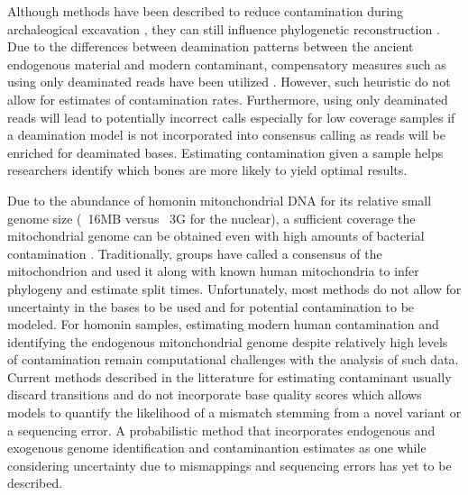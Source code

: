 \documentclass[a4paper,12pt]{article}
\begin{document}
Although methods have been described to reduce contamination during archaleogical excavation \cite{yang2005contamination}, they can still influence phylogenetic reconstruction \cite{wall2007inconsistencies}. Due to the differences between deamination patterns between the ancient endogenous material and modern contaminant, compensatory measures such as using only deaminated reads have been utilized \cite{skoglund2014separating}. However, such heuristic do not allow for estimates of contamination rates. Furthermore, using only deaminated reads will lead to potentially incorrect calls especially for low coverage samples if a deamination model is not incorporated into consensus calling as reads will be enriched for deaminated bases. Estimating contamination given a sample helps researchers identify which bones are more likely to yield optimal results. 

Due to the abundance of homonin mitonchondrial DNA for its relative small genome size (~16MB versus ~3G for the nuclear), a sufficient coverage the mitochondrial genome can be obtained even with high amounts of bacterial contamination \cite{}. Traditionally, groups have called a consensus of the mitochondrion and used it along with known human mitochondria to infer phylogeny and estimate split times. Unfortunately, most methods do not allow for uncertainty in the bases to be used and for potential contamination to be modeled. For homonin samples, estimating modern human contamination and identifying the endogenous mitonchondrial genome despite relatively high levels of contamination remain computational challenges with the analysis of such data. Current methods described in the litterature for estimating contaminant usually discard transitions and do not incorporate base quality scores which allows models to quantify the likelihood of a mismatch stemming from a novel variant or a sequencing error. A probabilistic method that incorporates endogenous and exogenous genome identification and contaminantion estimates as one while considering uncertainty due to mismappings and sequencing errors has yet to be described. 

\end{document}
